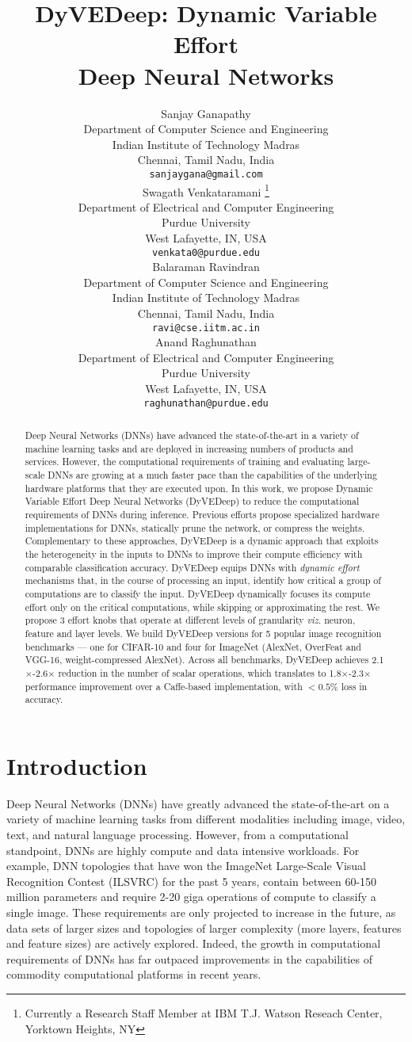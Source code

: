 \documentclass{article} %
\title{DyVEDeep: Dynamic Variable Effort \\ Deep Neural Networks}
\author{Sanjay Ganapathy \\
Department of Computer Science and Engineering\\
Indian Institute of Technology Madras\\
Chennai, Tamil Nadu, India \\
\texttt{sanjaygana@gmail.com} \\
\And
Swagath Venkataramani \thanks{Currently a Research Staff Member at IBM T.J. Watson Reseach Center, Yorktown Heights, NY} \\
Department of Electrical and Computer Engineering \\
Purdue University \\
West Lafayette, IN, USA \\
\texttt{venkata0@purdue.edu} \\
\And
Balaraman Ravindran \\
Department of Computer Science and Engineering\\
Indian Institute of Technology Madras\\
Chennai, Tamil Nadu, India \\
\texttt{ravi@cse.iitm.ac.in} \\
\And
Anand Raghunathan \\
Department of Electrical and Computer Engineering \\
Purdue University \\
West Lafayette, IN, USA \\
\texttt{raghunathan@purdue.edu} \\
}
\begin{document}
\nocite{DBLP:journals/corr/Graves16}

\maketitle

\begin{abstract}
Deep Neural Networks (DNNs) have advanced the state-of-the-art in a variety of machine learning tasks and are deployed in increasing numbers of products and services. However, the computational requirements of training and evaluating large-scale DNNs are growing at a much faster pace than the capabilities of the underlying hardware platforms that they are executed upon. In this work, we propose  Dynamic Variable Effort Deep Neural Networks (DyVEDeep) to reduce the computational requirements of DNNs during inference. Previous efforts propose specialized hardware implementations for DNNs, statically prune the network, or compress the weights. Complementary to these approaches, DyVEDeep is a dynamic approach that exploits the heterogeneity in the inputs to DNNs to improve their compute efficiency with comparable classification accuracy. DyVEDeep equips DNNs with \emph{dynamic effort} mechanisms that, in the course of processing an input, identify how critical a group of computations are to classify the input. DyVEDeep dynamically focuses its compute effort only on the critical computations, while skipping or approximating the rest. We propose 3 effort knobs that operate at different levels of granularity \emph{viz.} neuron, feature and layer levels. We build DyVEDeep versions for 5 popular image recognition benchmarks --- one for CIFAR-10 and four for ImageNet (AlexNet, OverFeat and VGG-16, weight-compressed AlexNet). Across all benchmarks, DyVEDeep achieves 2.1$\times$-2.6$\times$ reduction in the number of scalar operations, which translates to 1.8$\times$-2.3$\times$ performance improvement over a Caffe-based implementation, with $<0.5\%$ loss in accuracy. 
\end{abstract}

\section{Introduction}

Deep Neural Networks (DNNs) have greatly advanced the state-of-the-art on a variety of machine learning tasks from different modalities including image, video, text, and natural language processing. However, from a computational standpoint, DNNs are highly compute and data intensive workloads. For example, DNN topologies that have won the ImageNet Large-Scale Visual Recognition Contest (ILSVRC) for the past 5 years, contain between 60-150 million parameters and require 2-20 giga operations of compute to classify a single image. These requirements are only projected to increase in the future, as data sets of larger sizes and topologies of larger complexity (more layers, features and feature sizes) are actively explored. Indeed, the growth in computational requirements of DNNs has far outpaced improvements in the capabilities of commodity computational platforms in recent years.
\end{document}
